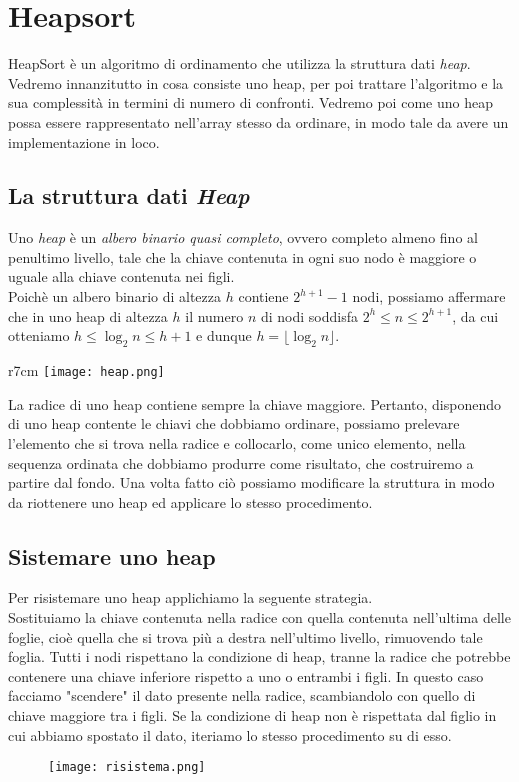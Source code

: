 \section{Heapsort}
HeapSort è un algoritmo di ordinamento che utilizza la struttura dati \emph{heap}.
Vedremo innanzitutto in cosa consiste uno heap, per poi trattare l'algoritmo e la sua 
complessità in termini di numero di confronti. Vedremo poi come uno heap possa
essere rappresentato nell'array stesso da ordinare, in modo tale da avere un implementazione in loco.

\subsection{La struttura dati \emph{Heap}}
Uno \emph{heap} è un \emph{albero binario quasi completo}, ovvero completo almeno
fino al penultimo livello, tale che la chiave contenuta in ogni suo nodo è maggiore 
o uguale alla chiave contenuta nei figli.\\
Poichè un albero binario di altezza $h$ contiene $2^{h+1} - 1$ nodi,
possiamo affermare che in uno heap di altezza $h$ il numero $n$ di nodi soddisfa $2^h \le n \le 2^{h + 1}$, da cui otteniamo
$h \le \log_2 n \le h + 1$ e dunque $h = \lfloor \log_2 n \rfloor$.\\
\begin{wrapfigure}{r}{7cm}
    \texttt{[image: heap.png]}
\end{wrapfigure}
La radice di uno heap contiene sempre la chiave maggiore. Pertanto, disponendo di 
uno heap contente le chiavi che dobbiamo ordinare, possiamo prelevare l'elemento che si trova
nella radice e collocarlo, come unico elemento, nella sequenza ordinata che dobbiamo
produrre come risultato, che costruiremo a partire dal fondo. Una volta fatto ciò possiamo
modificare la struttura in modo da riottenere uno heap ed applicare lo stesso procedimento.
\subsection{Sistemare uno heap}
Per risistemare uno heap applichiamo la seguente strategia.\\
Sostituiamo la chiave contenuta nella radice con quella contenuta nell'ultima
delle foglie, cioè quella che si trova più a destra nell'ultimo livello, rimuovendo
tale foglia. Tutti i nodi rispettano la condizione di heap, tranne la radice che potrebbe contenere 
una chiave inferiore rispetto a uno o entrambi i figli. In questo caso facciamo "scendere"
il dato presente nella radice, scambiandolo con quello di chiave maggiore tra i figli.
Se la condizione di heap non è rispettata dal figlio in cui abbiamo spostato il dato, 
iteriamo lo stesso procedimento su di esso.
\clearpage
\begin{figure}[h]
    \texttt{[image: risistema.png]}
\end{figure}
